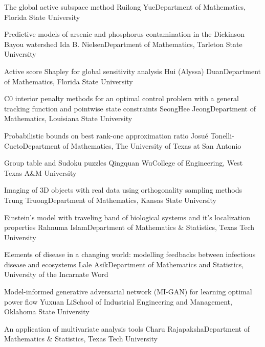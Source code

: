 \begin{posters}
\label{poster}
\item\poster
{The global active subspace method}
{Ruilong Yue}{Department of Mathematics, Florida State University}

\item\poster
{Predictive models of arsenic and phosphorus contamination in the Dickinson Bayou watershed}
{Ida B. Nielsen}{Department of Mathematics, Tarleton State University}

\item\poster
{Active score Shapley for global sensitivity analysis}
{Hui (Alyssa) Duan}{Department of Mathematics, Florida State University}

\item\poster
{C0 interior penalty methods for an optimal control problem with a general tracking function and pointwise state constraints}
{SeongHee Jeong}{Department of Mathematics, Louisiana State University}

\item\poster
{Probabilistic bounds on best rank-one approximation ratio}
{Josu\'e Tonelli-Cueto}{Department of Mathematics, The University of Texas at San Antonio}

\item\poster
{Group table and Sudoku puzzles}
{Qingquan Wu}{College of Engineering, West Texas A\&M University}

\item\poster
{Imaging of 3D objects with real data using orthogonality sampling methods}
{Trung Truong}{Department of Mathematics, Kansas State University}

\item\poster
{Einstein’s model with traveling band of biological systems and it’s localization properties}
{Rahnuma Islam}{Department of Mathematics \& Statistics, Texas Tech University}

\item\poster
{Elements of disease in a changing world: modelling feedbacks between infectious disease and ecosystems}
{Lale Asik}{Department of Mathematics and Statistics, University of the Incarnate Word}

\item\poster
{Model-informed generative adversarial network (MI-GAN) for learning optimal power flow}
{Yuxuan Li}{School of Industrial Engineering and Management, Oklahoma State University}

\item\poster
{An application of multivariate analysis tools}
{Charu Rajapaksha}{Department of Mathematics \& Statistics, Texas Tech University}


\end{posters}

